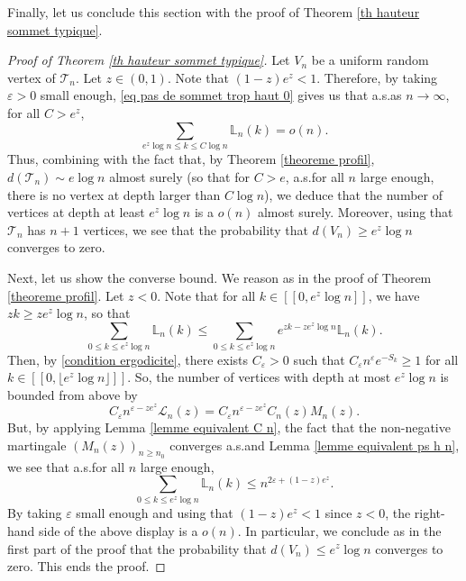 \documentclass[11pt]{article}
\numberwithin{equation}{section}
\def\vp{\varepsilon}
\def \T{\mathcal{T}}
\def \cL{\mathcal{L}}
\def\lb{[\![}
\def\rb{]\!]}
\begin{document}
Finally, let us conclude this section with the proof of Theorem \ref{th hauteur sommet typique}.
\begin{proof}[Proof of Theorem \ref{th hauteur sommet typique}]
	Let $V_n$ be a uniform random vertex of $\T_n$. Let $z \in (0,1)$. Note that $(1-z)e^z<1$. Therefore, by taking $\vp>0$ small enough, \eqref{eq pas de sommet trop haut 0} gives us that a.s.\@ as $n \to \infty$, for all $C>e^z$,
	\[
	\sum_{e^z \log n \le k \le C \log n} \mathbb{L}_n(k) = o(n).
	\]
	Thus, combining with the fact that, by Theorem \ref{theoreme profil}, $d(\T_n) \sim e \log n$ almost surely (so that for $C>e$, a.s.\@ for all $n$ large enough, there is no vertex at depth larger than $C\log n$), we deduce that the number of vertices at depth at least $e^z \log n$ is a $o(n)$ almost surely. Moreover, using that $\T_n$ has $n+1$ vertices, we see that the probability that $d(V_n)\ge e^z \log n$ converges to zero.
	
	Next, let us show the converse bound. We reason as in the proof of Theorem \ref{theoreme profil}. Let $z<0$. Note that for all $k \in \lb0, e^z \log n\rb$, we have $zk \ge ze^z \log n$, so that
	\[
	\sum_{0 \le k \le e^z \log n} \mathbb{L}_n (k)\le  \sum_{0 \le k \le e^z \log n}e^{zk - z e^z \log n} \mathbb{L}_n(k).
	\]
	Then, by \eqref{condition ergodicite}, there exists $C_\vp>0$ such that $C_\vp n^\vp e^{-S_k}\ge 1$ for all $k\in \lb0,\lfloor  e^z \log n \rfloor \rb$. So, the number of vertices with depth at most $e^z \log n$ is bounded from above by
	\[
	C_\vp n^{\vp -z e^z} \cL_n(z)  = C_\vp n^{\vp -z e^z} C_n(z)M_n(z) .
	\]
	But, by applying Lemma \ref{lemme equivalent C n}, the fact that the non-negative martingale $(M_n(z))_{n\ge n_0}$ converges a.s.\@ and Lemma \ref{lemme equivalent ps h n}, we see that a.s.\@ for all $n$ large enough,
	\[
	\sum_{0 \le k \le e^z \log n} \mathbb{L}_n (k) \le n^{2 \vp + (1-z)e^z}.
	\]
	By taking $\vp$ small enough and using that $(1-z)e^z<1$ since $z<0$, the right-hand side of the above display is a $o(n)$. In particular, we conclude as in the first part of the proof that the probability that $d(V_n) \le e^z \log n$ converges to zero. This ends the proof.
\end{proof}
\end{document}
